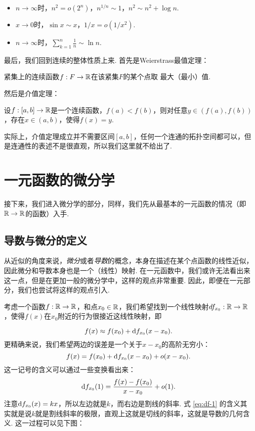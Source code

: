 \begin{example}
\begin{itemize}
    \item $n\to\infty$时，$n^2=o(2^n)$，$n^{1/n}\sim 1$，$n^2\sim n^2+\log n$.
    \item $x\to 0$时，$\sin x\sim x$，$1/x=o(1/x^2)$. 
    \item $n\to\infty$时，$\sum_{k=1}^n\frac{1}{n}\sim\ln n$.
\end{itemize}
\end{example}

最后，我们回到连续的整体性质上来. 首先是Weierstrass最值定理：

\begin{theorem}[Weierstrass最值定理]\label{thm:weierstrass}
    紧集上的连续函数$f:F\to\mathbb{R}$在该紧集$F$的某个点取 最大（最小）值. 
\end{theorem}

然后是介值定理：
\begin{theorem}[介值定理]\label{thm:intermediate}
    设$f:[a,b]\to\mathbb{R}$是一个连续函数，$f(a)<f(b)$，则对任意$y\in(f(a),f(b))$，存在$x\in(a,b)$，使得$f(x)=y$.
\end{theorem}
实际上，介值定理成立并不需要区间$[a,b]$，任何一个连通的拓扑空间都可以，但是连通性的表述不是很直观，所以我们这里就不给出了. 


\section{一元函数的微分学}

接下来，我们进入微分学的部分，同样，我们先从最基本的一元函数的情况（即$\mathbb{R}\to\mathbb{R}$的函数）入手. 

\subsection{导数与微分的定义}

从近似的角度来说，\emph{微分}或者\emph{导数}的概念，本身在描述在某个点函数的线性近似，因此微分和导数本身也是一个（线性）映射. 在一元函数中，我们或许无法看出来这一点，但是在更加一般的微分学中，这样的观点非常重要. 因此，即便在一元部分，我们也尝试将这样的观点引入. 

考虑一个函数$f:\mathbb{R}\to\mathbb{R}$，和点$x_0\in\mathbb{R}$，我们希望找到一个线性映射$df_{x_0}:\mathbb{R}\to\mathbb{R}$，使得$f(x)$在$x_0$附近的行为很接近这线性映射，即

\[
    f(x)\approx f(x_0)+\mathrm{d} f_{x_0}(x-x_0).
\]
更精确来说，我们希望两边的误差是一个关于$x-x_0$的高阶无穷小：
\[
    f(x)=f(x_0)+\mathrm{d} f_{x_0}(x-x_0)+o(x-x_0).
\]
这一记号的含义可以通过一些变换看出来：
\begin{equation}
\mathrm{d} f_{x_0}(1)=\frac{f(x)-f(x_0)}{x-x_0}+o(1).\label{eq:df-1}
\end{equation}
注意$\mathrm{d} f_{x_0}(x)=kx$，所以左边就是$k$，而右边是割线的斜率. 式 \eqref{eq:df-1} 的含义其实就是说$k$就是割线斜率的极限，直观上这就是切线的斜率，这就是导数的几何含义. 这一过程可以见下图：

